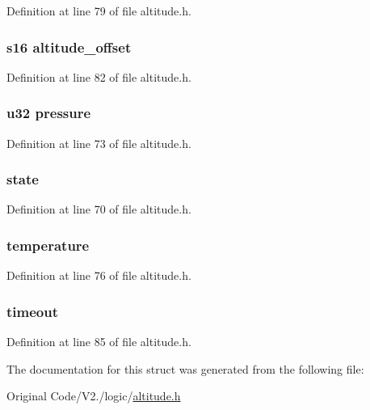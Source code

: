\-Definition at line 79 of file altitude.\-h.

\hypertarget{structalt_aef78b8fb382f9cd58ccbec4471101398}{
\subsubsection[{altitude\-\_\-offset}]{\setlength{\rightskip}{0pt plus 5cm}s16 {\bf altitude\-\_\-offset}}}\label{structalt_aef78b8fb382f9cd58ccbec4471101398}


\-Definition at line 82 of file altitude.\-h.

\hypertarget{structalt_a3dd5bcc30ce1408a2e33442767ef6971}{
\subsubsection[{pressure}]{\setlength{\rightskip}{0pt plus 5cm}u32 {\bf pressure}}}\label{structalt_a3dd5bcc30ce1408a2e33442767ef6971}


\-Definition at line 73 of file altitude.\-h.

\hypertarget{structalt_ac6b2518df4ca45cee089e61f152572b2}{
\subsubsection[{state}]{ {\bf state}}}\label{structalt_ac6b2518df4ca45cee089e61f152572b2}


\-Definition at line 70 of file altitude.\-h.

\hypertarget{structalt_a157379ac5ab58014f162220393ace12d}{
\subsubsection[{temperature}]{ {\bf temperature}}}\label{structalt_a157379ac5ab58014f162220393ace12d}


\-Definition at line 76 of file altitude.\-h.

\hypertarget{structalt_a735bf6536b07682f96c9417b0f1e9079}{
\subsubsection[{timeout}]{ {\bf timeout}}}\label{structalt_a735bf6536b07682f96c9417b0f1e9079}


\-Definition at line 85 of file altitude.\-h.



\-The documentation for this struct was generated from the following file\-:\begin{DoxyCompactItemize}
\item 
\-Original Code/\-V2./logic/\hyperlink{altitude_8h}{altitude.\-h}\end{DoxyCompactItemize}
